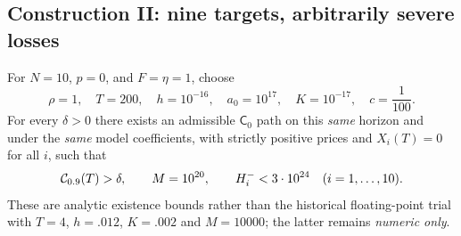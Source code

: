 \documentclass[review,hidelinks,onefignum,onetabnum]{siamonline250211}%
\begin{document}
\subsection{Construction II: nine targets, arbitrarily severe losses}
\label{sec:conII}
\begin{theorem}
\label{thm:nine}
For $N=10$, $p=0$, and $F=\eta=1$, choose
\begin{equation}\label{eq:ninecert}
 \rho=1,\quad T=200,\quad h=10^{-16},\quad
 a_0=10^{17},\quad K=10^{-17},\quad c=\frac1{100}.
\end{equation}
For every $\delta>0$ there exists an admissible $\mathsf C_0$
path on this \emph{same} horizon and under the \emph{same}
model coefficients, with strictly positive prices and
$X_i(T)=0$ for all $i$, such that
\begin{equation}\label{eq:nineresult}
 \mathcal{C}_{0.9}(T)>\delta,\qquad M=10^{20},\qquad
 H_i^-<3\cdot10^{24}\quad(i=1,\dots,10).
\end{equation}
These are analytic existence bounds rather than the
historical floating-point trial with $T=4$, $h=.012$,
$K=.002$ and $M=10000$; the latter remains \emph{numeric only}.
\end{theorem}
\end{document}
